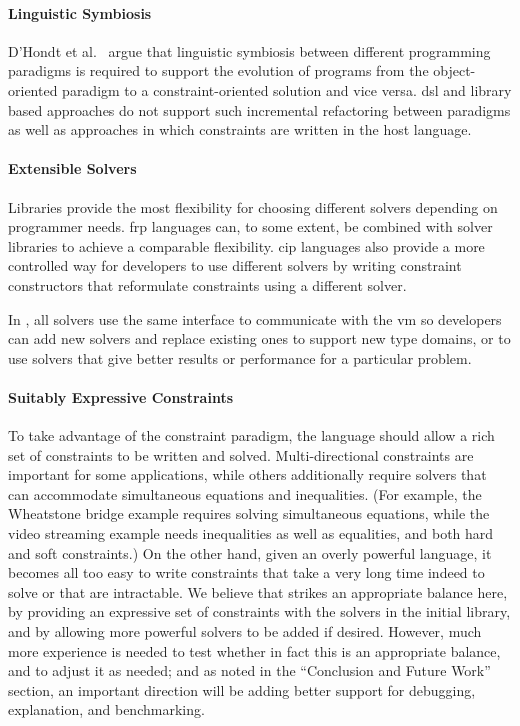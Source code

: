 \paragraph{Linguistic Symbiosis}
D'Hondt et al.~\cite{d2004seamless} argue that linguistic symbiosis
between different programming paradigms is required to support the
evolution of programs from the object-oriented paradigm to a
constraint-oriented solution and vice versa. \ac{dsl} and library
based approaches do not support such incremental refactoring between
paradigms as well as approaches in which constraints are written in the
host language.

\paragraph{Extensible Solvers}
Libraries provide the most flexibility for choosing different solvers
depending on programmer needs. \ac{frp} languages can, to some extent,
be combined with solver libraries to achieve a comparable
flexibility. \ac{cip} languages also provide a more controlled way for
developers to use different solvers by writing constraint constructors
that reformulate constraints using a different solver.

In \langname, all solvers use the same interface to communicate with
the \ac{vm} so developers can add new solvers and replace existing
ones to support new type domains, or to use solvers that give better
results or performance for a particular problem.

\paragraph{Suitably Expressive Constraints}
To take advantage of the constraint paradigm, the language should
allow a rich set of constraints to be written and solved.
Multi-directional constraints are important for some applications,
while others additionally require solvers that can accommodate
simultaneous equations and inequalities.  (For example, the Wheatstone
bridge example requires solving simultaneous equations, while the
video streaming example needs inequalities as well as equalities, and
both hard and soft constraints.)  On the other hand, given an overly
powerful language, it becomes all too easy to write constraints that
take a very long time indeed to solve or that are intractable.  We
believe that \langname strikes an appropriate balance here, by
providing an expressive set of constraints with the solvers in the
initial library, and by allowing more powerful solvers to be added if
desired.  However, much more experience is needed to test whether in
fact this is an appropriate balance, and to adjust it as needed; and
as noted in the ``Conclusion and Future Work'' section, an important
direction will be adding better support for debugging, explanation,
and benchmarking.

